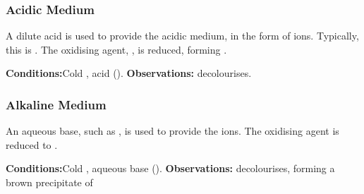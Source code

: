 	\subsubsection{Acidic Medium}

	A dilute acid is used to provide the acidic medium, in the form of  ions. Typically, this is . The oxidising
	agent, , is reduced, forming .

	\vspace{1.5em}
	\vbox{\textbf{Conditions:}\tabto{35mm}Cold , acid ().}
	\vbox{\textbf{Observations:}  decolourises.}





	\subsubsection{Alkaline Medium}

	An aqueous base, such as , is used to provide the  ions. The oxidising agent  is reduced to
	.

	\vspace{1.5em}
	\vbox{\textbf{Conditions:}\tabto{35mm}Cold , aqueous base ().}
	\vbox{\textbf{Observations:}  decolourises, forming
		a {\color{Brown}brown} precipitate of }





